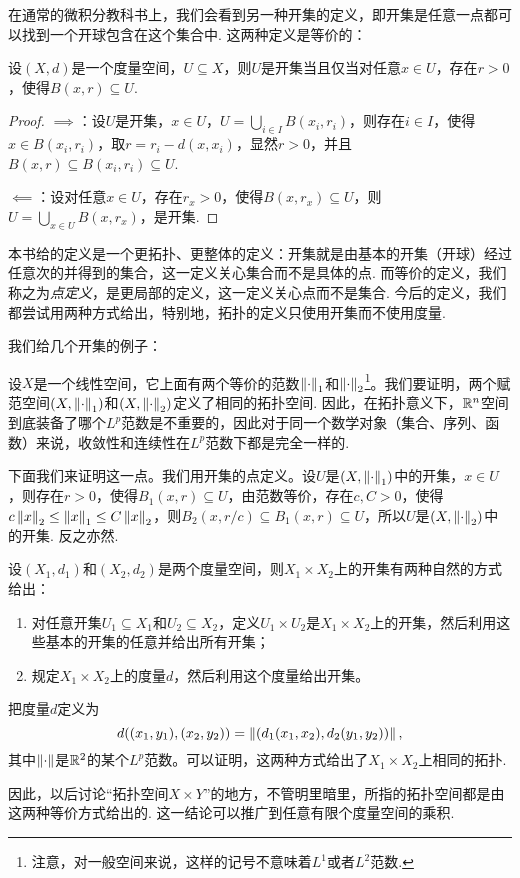 在通常的微积分教科书上，我们会看到另一种开集的定义，即开集是任意一点都可以找到一个开球包含在这个集合中. 这两种定义是等价的：

\begin{proposition}\label{prop:open-ball}
    设$(X,d)$是一个度量空间，$U\subseteq X$，则$U$是开集当且仅当对任意$x\in U$，存在$r>0$，使得$B(x,r)\subseteq U$.
\end{proposition}
\begin{proof}
   $\implies$：设$U$是开集，$x\in U$，$U=\bigcup_{i\in I}B(x_i,r_i)$，则存在$i\in I$，使得$x\in B(x_i,r_i)$，取$r=r_i-d(x,x_i)$，显然$r>0$，并且$B(x,r)\subseteq B(x_i,r_i)\subseteq U$.

    $\impliedby$：设对任意$x\in U$，存在$r_x>0$，使得$B(x,r_x)\subseteq U$，则$U=\bigcup_{x\in U}B(x,r_x)$，是开集. 
\end{proof}

本书给的定义是一个更拓扑、更整体的定义：开集就是由基本的开集（开球）经过任意次的并得到的集合，这一定义关心集合而不是具体的点. 而等价的定义，我们称之为\emph{点定义}，是更局部的定义，这一定义关心点而不是集合. 今后的定义，我们都尝试用两种方式给出，特别地，拓扑的定义只使用开集而不使用度量. 


我们给几个开集的例子：
\begin{example}[范等价拓扑空间]\label{ex:lp-topology}
    设$X$是一个线性空间，它上面有两个等价的范数$\left\|\cdot\right\|_1$和$\left\|\cdot\right\|_2$\footnote{注意，对一般空间来说，这样的记号不意味着$L^1$或者$L^2$范数. }。我们要证明，两个赋范空间$(X,\left\|\cdot\right\|_1)$和$(X,\left\|\cdot\right\|_2)$定义了相同的拓扑空间. 因此，在拓扑意义下，$\mathbb{R}^n$空间到底装备了哪个$L^p$范数是不重要的，因此对于同一个数学对象（集合、序列、函数）来说，收敛性和连续性在$L^p$范数下都是完全一样的. 

    下面我们来证明这一点。我们用开集的点定义。设$U$是$(X,\left\|\cdot\right\|_1)$中的开集，$x\in U$，则存在$r>0$，使得$B_1(x,r)\subseteq U$，由范数等价，存在$c,C>0$，使得$c\left\|x\right\|_2\leq \left\|x\right\|_1\leq C\left\|x\right\|_2$，则$B_2(x,r/c)\subseteq B_1(x,r)\subseteq U$，所以$U$是$(X,\left\|\cdot\right\|_2)$中的开集. 反之亦然. 
\end{example}

\begin{example}[乘积拓扑空间]\label{ex:product-topology}
    设$(X_1,d_1)$和$(X_2,d_2)$是两个度量空间，则$X_1\times X_2$上的开集有两种自然的方式给出：
    \begin{enumerate}
        \item 对任意开集$U_1\subseteq X_1$和$U_2\subseteq X_2$，定义$U_1\times U_2$是$X_1\times X_2$上的开集，然后利用这些基本的开集的任意并给出所有开集；
        \item 规定$X_1\times X_2$上的度量$d$，然后利用这个度量给出开集。
    \end{enumerate}

    把度量$d$定义为
    \[d((x_1,y_1),(x_2,y_2))=\left\|(d_1(x_1,x_2),d_2(y_1,y_2))\right\|,\]
    其中$\left\|\cdot\right\|$是$\mathbb{R}^2$的某个$L^p$范数。可以证明，这两种方式给出了$X_1\times X_2$上相同的拓扑. 
    
    因此，以后讨论“拓扑空间$X\times Y$”的地方，不管明里暗里，所指的拓扑空间都是由这两种等价方式给出的. 这一结论可以推广到任意有限个度量空间的乘积. 
\end{example}

